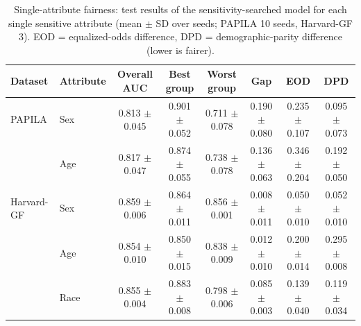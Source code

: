 \begin{table}[t]
\centering
\caption{Single-attribute fairness: test results of the sensitivity-searched model for each single sensitive attribute (mean $\pm$ SD over seeds; PAPILA 10 seeds, Harvard-GF 3). EOD = equalized-odds difference, DPD = demographic-parity difference (lower is fairer).}
\label{tab:single}
\small
\begin{tabular}{llcccccc}
\toprule
Dataset & Attribute & Overall AUC & Best group & Worst group & Gap & EOD & DPD \\
\midrule
PAPILA & Sex & 0.813 $\pm$ 0.045 & 0.901 $\pm$ 0.052 & 0.711 $\pm$ 0.078 & 0.190 $\pm$ 0.080 & 0.235 $\pm$ 0.107 & 0.095 $\pm$ 0.073 \\
 & Age & 0.817 $\pm$ 0.047 & 0.874 $\pm$ 0.055 & 0.738 $\pm$ 0.078 & 0.136 $\pm$ 0.063 & 0.346 $\pm$ 0.204 & 0.192 $\pm$ 0.050 \\
\midrule
Harvard-GF & Sex & 0.859 $\pm$ 0.006 & 0.864 $\pm$ 0.011 & 0.856 $\pm$ 0.001 & 0.008 $\pm$ 0.011 & 0.050 $\pm$ 0.010 & 0.052 $\pm$ 0.010 \\
 & Age & 0.854 $\pm$ 0.010 & 0.850 $\pm$ 0.015 & 0.838 $\pm$ 0.009 & 0.012 $\pm$ 0.010 & 0.200 $\pm$ 0.014 & 0.295 $\pm$ 0.008 \\
 & Race & 0.855 $\pm$ 0.004 & 0.883 $\pm$ 0.008 & 0.798 $\pm$ 0.006 & 0.085 $\pm$ 0.003 & 0.139 $\pm$ 0.040 & 0.119 $\pm$ 0.034 \\
\bottomrule
\end{tabular}
\end{table}

